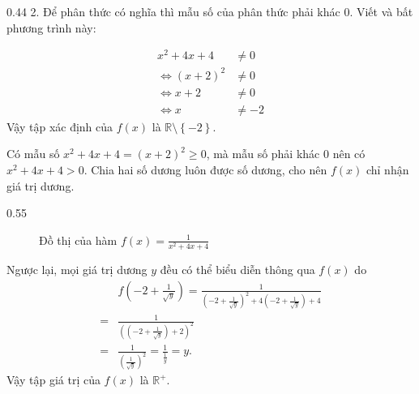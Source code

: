 {
   \begin{minipageindent}{0.44\textwidth}
      2. Để phân thức có nghĩa thì mẫu số của phân thức phải khác $0$. Viết và bất phương trình này:

      \begin{align*}
         x^2 + 4x + 4 &\neq 0\\
         \iff \left(x + 2\right)^2 &\neq 0\\
         \iff x + 2 &\neq 0 \\
         \iff x &\neq -2
      \end{align*}
      Vậy tập xác định của $f(x)$ là $\mathbb{R} \setminus \left\{-2\right\}$.

      Có mẫu số $x^2 + 4x + 4 = (x + 2)^2 \geq 0$, mà mẫu số phải khác $0$ nên có $x^2 + 4x + 4 > 0$. Chia hai số dương luôn được số dương, cho nên $f(x)$ chỉ nhận giá trị dương.
   \end{minipageindent}
   \hfill
   \begin{minipageindent}{0.55\textwidth}
      \begin{figure}[H]
         \centering
         \caption{Đồ thị của hàm $f(x) = \frac{1}{x^2 + 4x + 4}$}
         \label{fig:ham_so_mot_bien:phan_thuc:1_x2_4x_4}
      \end{figure}
   \end{minipageindent}
}

Ngược lại, mọi giá trị dương $y$ đều có thể biểu diễn thông qua $f(x)$ do \begin{align*}
   &f\left(-2 + \frac{1}{\sqrt{y}}\right) = \frac{1}{\left(-2 + \frac{1}{\sqrt{y}}\right)^2 + 4\left(-2 + \frac{1}{\sqrt{y}}\right) + 4}\\
   =& \frac{1}{\left(\left(-2 + \frac{1}{\sqrt{y}}\right) + 2\right)^2} \\
   =&\frac{1}{\left(\frac{1}{\sqrt{y}}\right)^2} =\frac{1}{\frac{1}{y}} =y.
\end{align*}
Vậy tập giá trị của $f(x)$ là $\mathbb{R}^+$.

